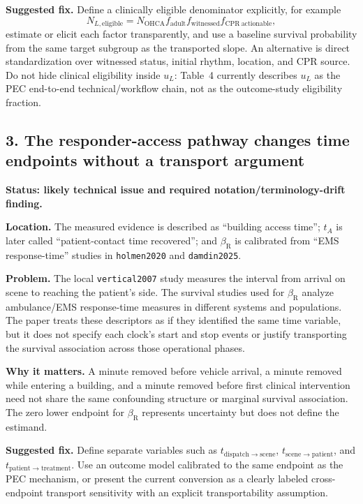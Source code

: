 \documentclass[11pt]{article}
\begin{document}
\textbf{Suggested fix.} Define a clinically eligible denominator explicitly,
for example
\[
N_{L,\mathrm{eligible}}
=N_{\mathrm{OHCA}}f_{\mathrm{adult}}f_{\mathrm{witnessed}}
f_{\mathrm{CPR\ actionable}},
\]
estimate or elicit each factor transparently, and use a baseline survival
probability from the same target subgroup as the transported slope.  An
alternative is direct standardization over witnessed status, initial rhythm,
location, and CPR source.  Do not hide clinical eligibility inside $u_L$:
Table~4 currently describes $u_L$ as the PEC end-to-end technical/workflow
chain, not as the outcome-study eligibility fraction.

\subsection*{3. The responder-access pathway changes time endpoints without a
transport argument}

\textbf{Status: likely technical issue and required notation/terminology-drift
finding.}

\textbf{Location.} The measured evidence is described as ``building access
time''; $t_A$ is later called ``patient-contact time recovered''; and
$\beta_{\mathrm R}$ is calibrated from ``EMS response-time'' studies in
\texttt{holmen2020} and \texttt{damdin2025}.

\textbf{Problem.} The local \texttt{vertical2007} study measures the interval
from arrival on scene to reaching the patient's side.  The survival studies
used for $\beta_{\mathrm R}$ analyze ambulance/EMS response-time measures in
different systems and populations.  The paper treats these descriptors as if
they identified the same time variable, but it does not specify each clock's
start and stop events or justify transporting the survival association across
those operational phases.

\textbf{Why it matters.} A minute removed before vehicle arrival, a minute
removed while entering a building, and a minute removed before first clinical
intervention need not share the same confounding structure or marginal survival
association.  The zero lower endpoint for $\beta_{\mathrm R}$ represents
uncertainty but does not define the estimand.

\textbf{Suggested fix.} Define separate variables such as
$t_{\mathrm{dispatch\to scene}}$, $t_{\mathrm{scene\to patient}}$, and
$t_{\mathrm{patient\to treatment}}$.  Use an outcome model calibrated to the
same endpoint as the PEC mechanism, or present the current conversion as a
clearly labeled cross-endpoint transport sensitivity with an explicit
transportability assumption.
\end{document}
